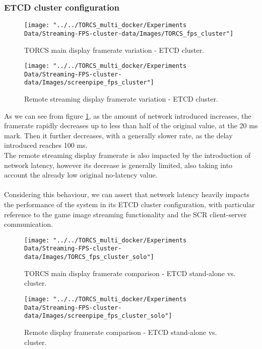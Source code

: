 \subsubsection{ETCD cluster configuration}
\begin{figure}[h!]
	\centering
	\texttt{[image: "../../TORCS\_multi\_docker/Experiments Data/Streaming-FPS-cluster-data/Images/TORCS\_fps\_cluster"]}
	\caption[TORCS main display framerate variation - ETCD cluster]{TORCS main display framerate variation - ETCD cluster.}
	\label{fig:torcs-merged-fps-etcd-cluster}
\end{figure}
\begin{figure}[h!]
	\centering
	\texttt{[image: "../../TORCS\_multi\_docker/Experiments Data/Streaming-FPS-cluster-data/Images/screenpipe\_fps\_cluster"]}
	\caption[Remote streaming display framerate variation - ETCD cluster]{Remote streaming display framerate variation - ETCD cluster.}
	\label{fig:screenpipe-merged-fps-etcd-cluster}
\end{figure}
As we can see from figure \ref{fig:torcs-merged-fps-etcd-cluster}, as the amount of network introduced increases, the framerate rapidly decreases up to less than half of the original value, at the 20 ms mark. Then it further decreases, with a generally slower rate, as the delay introduced reaches 100 ms. \\
The remote streaming display framerate is also impacted by the introduction of network latency, however its decrease is generally limited, also taking into account the already low original no-latency value. \\ \\
Considering this behaviour, we can assert that network latency heavily impacts the performance of the system in its ETCD cluster configuration, with particular reference to the game image streaming functionality and the SCR client-server communication.
\begin{figure}[h!]
	\centering
	\texttt{[image: "../../TORCS\_multi\_docker/Experiments Data/Streaming-FPS-cluster-data/Images/TORCS\_fps\_cluster\_solo"]}
	\caption[TORCS main display framerate comparison - ETCD stand-alone vs. cluster]{TORCS main display framerate comparison - ETCD stand-alone vs. cluster.}
	\label{fig:torcs-fps-cluster-solo-etcd}
\end{figure}
\begin{figure}[h!]
	\centering
	\texttt{[image: "../../TORCS\_multi\_docker/Experiments Data/Streaming-FPS-cluster-data/Images/screenpipe\_fps\_cluster\_solo"]}
	\caption[Remote display framerate comparison - ETCD stand-alone vs. cluster]{Remote display framerate comparison - ETCD stand-alone vs. cluster.}
	\label{fig:screenpipe-fps-cluster-solo-etcd}
\end{figure}
